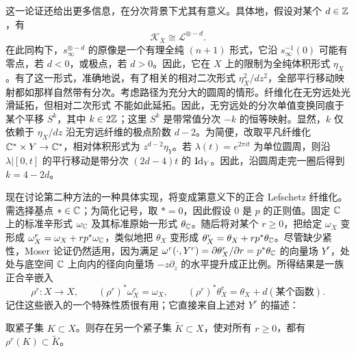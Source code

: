 这一论证还给出更多信息，在分次背景下尤其有意义。具体地，假设对某个 $d\in\mathbb Z$，有
\begin{equation}\label{eq:19.2}
\mathcal K_{\overline X}\cong\mathcal L^{\otimes-d}.
\end{equation}
在此同构下，$s_\infty^{\otimes-d}$ 的原像是一个有理全纯 $(n+1)$ 形式，它沿 $s_\infty^{-1}(0)$ 可能有零点，若 $d<0$，或极点，若 $d>0$。因此，它在 $X$ 上的限制为全纯体积形式 $\eta_X$。有了这一形式，准确地说，有了相关的相对二次形式 $\eta_X^2/dz^2$，全部平行移动映射都如那样自然带有分次。考虑路径为充分大的圆周的情形。纤维化在无穷远处光滑延拓，但相对二次形式
不能如此延拓。因此，无穷远处的分次单值变换同痕于某个平移 $S^k$，其中 $k\in2\mathbb Z$；这里 $S^k$ 是带常值分次 $-k$ 的恒等映射。显然，$k$ 仅依赖于 $\eta_X/dz$ 沿无穷远纤维的极点阶数 $d-2$。为简便，改取平凡纤维化 $\mathbb C^*\times Y\to\mathbb C^*$，相对体积形式为 $z^{d-2}\eta_Y$。若 $\lambda(t)=e^{2\pi it}$ 为单位圆周，则沿 $\lambda|[0,t]$ 的平行移动是带分次 $(2d-4)t$ 的 $\operatorname{Id}_Y$。因此，沿圆周走完一圈后得到 $k=4-2d$。

现在讨论第二种方法的一种具体实现，将变成第意义下的正合 Lefschetz 纤维化。需选择基点 $*\in\mathbb C$；为简化记号，取 $*=0$，因此假设 $0$ 是 $p$ 的正则值。固定 $\mathbb C$ 上的标准辛形式 $\omega_{\mathbb C}$ 及其标准原始一形式 $\theta_{\mathbb C}$。随后将对某个 $r\ge0$，把给定 $\omega_X$ 变形成 $\omega_X^r=\omega_X+rp^*\omega_{\mathbb C}$，类似地把 $\theta_X$ 变形成 $\theta_X^r=\theta_X+rp^*\theta_{\mathbb C}$。尽管缺少紧性，Moser 论证仍然适用，因为满足 $\omega^r(\cdot,Y^r)=\partial\theta_X^r/\partial r=p^*\theta_{\mathbb C}$ 的向量场 $Y^r$，处处与底空间 $\mathbb C$ 上向内的径向向量场 $-z\partial_z$ 的水平提升成正比例。所得结果是一族正合辛嵌入
\[
\rho^r:X\longrightarrow X,\qquad
(\rho^r)^*\omega_X^r=\omega_X,\qquad
(\rho^r)^*\theta_X^r=\theta_X+d(\text{某个函数}).
\]
记住这些嵌入的一个特殊性质很有用；它直接来自上述对 $Y^r$ 的描述：

\begin{lemma}\label{st:19.6}
取紧子集 $K\subset X$。则存在另一个紧子集 $\widetilde K\subset X$，使对所有 $r\ge0$，都有 $\rho^r(K)\subset\widetilde K$。
\end{lemma}

